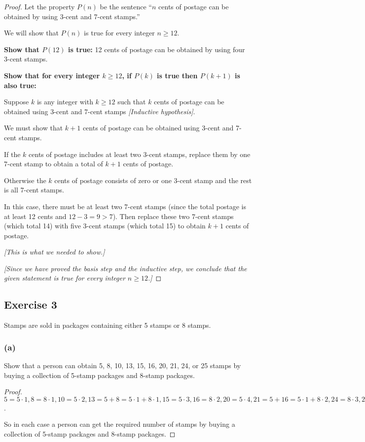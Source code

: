 \documentclass[14pt]{extarticle}
\begin{document}
\begin{proof}
    Let the property $P(n)$ be the sentence “$n$ cents of postage can be obtained by using 3-cent and 7-cent stamps.”

    We will show that $P(n)$ is true for every integer $n \geq 12$.

        {\bf Show that $P(12)$ is true:} 12 cents of postage can be obtained by using four 3-cent stamps.

        {\bf Show that for every integer $k \geq 12$, if $P(k)$ is true then $P(k + 1)$ is also true:}

    Suppose $k$ is any integer with $k \geq 12$ such that $k$ cents of postage can be obtained using 3-cent and 7-cent stamps {\it [Inductive hypothesis]}.

    We must show that $k + 1$ cents of postage can be obtained using 3-cent and 7-cent stamps.

    If the $k$ cents of postage includes at least two 3-cent stamps, replace them by one 7-cent stamp to obtain a total of $k + 1$ cents of postage.

    Otherwise the $k$ cents of postage consists of zero or one 3-cent stamp and the rest is all 7-cent stamps.

    In this case, there must be at least two 7-cent stamps (since the total postage is at least 12 cents and $12 - 3 = 9 > 7$). Then replace these two 7-cent stamps (which total 14) with five 3-cent stamps (which total 15) to obtain $k+1$ cents of postage.

        {\it [This is what we needed to show.]}

        {\it [Since we have proved the basis step and the inductive step, we conclude that the given statement is true for every integer $n \geq 12$.]}
\end{proof}

\subsection{Exercise 3}
Stamps are sold in packages containing either 5 stamps or 8 stamps.

\subsubsection{(a)}
Show that a person can obtain 5, 8, 10, 13, 15, 16, 20, 21, 24, or 25 stamps by buying a collection of 5-stamp packages and 8-stamp packages.

\begin{proof}
    $5 = 5 \cdot 1, 8 = 8 \cdot 1, 10 = 5 \cdot 2, 13 = 5 + 8 = 5 \cdot 1 + 8 \cdot 1, 15 = 5 \cdot 3, 16 = 8 \cdot 2, 20 = 5 \cdot 4, 21 = 5 + 16 = 5 \cdot 1 + 8 \cdot 2, 24 = 8 \cdot 3, 25 = 5 \cdot 5$.

    So in each case a person can get the required number of stamps by buying a collection of 5-stamp packages and 8-stamp packages.
\end{proof}
\end{document}

